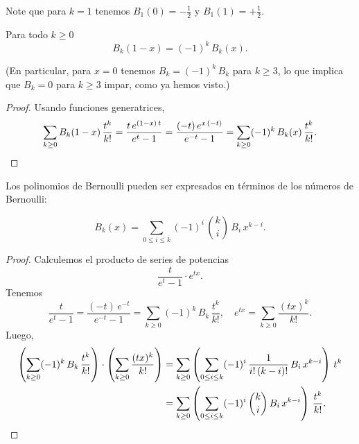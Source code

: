 \documentclass{article}
\numberwithin{equation}{section}
\theoremstyle{definition}
\begin{document}
Note que para $k = 1$ tenemos $B_1 (0) = -\frac{1}{2}$ y
$B_1 (1) = +\frac{1}{2}$.

\begin{observacion}
  Para todo $k \ge 0$
  $$B_k (1-x) = (-1)^k\,B_k (x).$$
\end{observacion}

\noindent (En particular, para $x = 0$ tenemos $B_k = (-1)^k\,B_k$ para
$k \ge 3$, lo que implica que $B_k = 0$ para $k \ge 3$ impar, como ya hemos
visto.)

\begin{proof}
  Usando funciones generatrices,
  \[ \sum_{k\ge 0} B_k (1-x)\,\frac{t^k}{k!} =
    \frac{t\,e^{(1-x)\,t}}{e^t - 1} =
    \frac{(-t)\,e^{x\,(-t)}}{e^{-t} - 1} =
    \sum_{k\ge 0} (-1)^k\,B_k (x)\,\frac{t^k}{k!}. \qedhere \]
\end{proof}

Los polinomios de Bernoulli pueden ser expresados en términos de los números de
Bernoulli:

\begin{proposicion}
  \label{proposicion:expresion-para-los-polinomios-de-Bernoulli}
  $$B_k (x) = \sum_{0 \le i \le k} (-1)^i \, {k \choose i}\,B_i\,x^{k-i}.$$

  \begin{proof}
    Calculemos el producto de series de potencias
    $$\frac{t}{e^t-1}\cdot e^{tx}.$$
    Tenemos
    $$\frac{t}{e^t-1} = \frac{(-t)\,e^{-t}}{e^{-t} - 1} =
    \sum_{k \ge 0} (-1)^k \, B_k \, \frac{t^k}{k!}, \quad
    e^{tx} = \sum_{k \ge 0} \frac{(tx)^k}{k!}.$$
    Luego,
    \begin{align*}
      \left(\sum_{k \ge 0} (-1)^k \, B_k \, \frac{t^k}{k!}\right) \cdot \left(\sum_{k \ge 0} \frac{(tx)^k}{k!}\right) & = \sum_{k \ge 0} \left(\sum_{0 \le i \le k} (-1)^i \, \frac{1}{i! \, (k-i)!} \, B_i\,x^{k-i}\right)\,t^k \\
                                                                                                                      & = \sum_{k \ge 0} \left(\sum_{0 \le i \le k} (-1)^i \, {k \choose i} \, B_i\,x^{k-i}\right)\,\frac{t^k}{k!}.
                                                                                                                        \qedhere
    \end{align*}
  \end{proof}
\end{proposicion}
\end{document}
